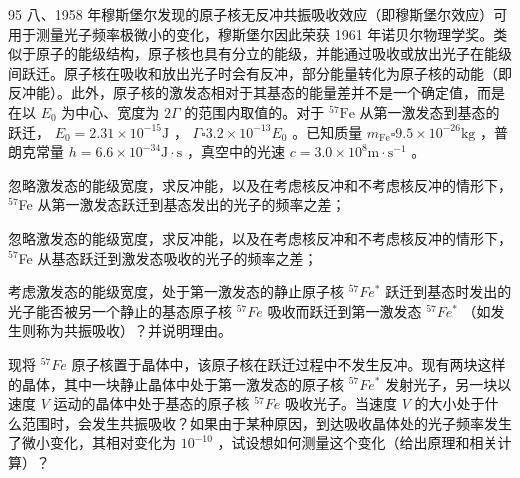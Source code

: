 \begin{problem}[第35届全国中学生物理竞赛复赛][穆斯堡尔效应]{95}
八、1958 年穆斯堡尔发现的原子核无反冲共振吸收效应（即穆斯堡尔效应）可用于测量光子频率极微小的变化，穆斯堡尔因此荣获 1961 年诺贝尔物理学奖。类似于原子的能级结构，原子核也具有分立的能级，并能通过吸收或放出光子在能级间跃迁。原子核在吸收和放出光子时会有反冲，部分能量转化为原子核的动能（即反冲能）。此外，原子核的激发态相对于其基态的能量差并不是一个确定值，而是在以 $E_0$ 为中心、宽度为 $2\Gamma$ 的范围内取值的。对于 $^{57}\text{Fe}$ 从第一激发态到基态的跃迁， $E_0 = 2.31 \times 10^{-15}\text{J}$ ， $\Gamma \square 3.2 \times 10^{-13}E_0$ 。已知质量 $m_{\text{Fe}} \square 9.5 \times 10^{-26}\text{kg}$ ，普朗克常量 $h = 6.6 \times 10^{-34}\text{J} \cdot \text{s}$ ，真空中的光速 $c = 3.0 \times 10^{8}\text{m} \cdot \text{s}^{-1}$ 。
\begin{subproblem}
忽略激发态的能级宽度，求反冲能，以及在考虑核反冲和不考虑核反冲的情形下， $^{57}$Fe 从第一激发态跃迁到基态发出的光子的频率之差；
\end{subproblem}
\begin{subproblem}
忽略激发态的能级宽度，求反冲能，以及在考虑核反冲和不考虑核反冲的情形下， $^{57}$Fe 从基态跃迁到激发态吸收的光子的频率之差；
\end{subproblem}
\begin{subproblem}
考虑激发态的能级宽度，处于第一激发态的静止原子核 $^{57}Fe^{*}$ 跃迁到基态时发出的光子能否被另一个静止的基态原子核 $^{57}Fe$ 吸收而跃迁到第一激发态 $^{57}Fe^{*}$ （如发生则称为共振吸收）？并说明理由。
\end{subproblem}
\begin{subproblem}
现将 ${}^{57}Fe$ 原子核置于晶体中，该原子核在跃迁过程中不发生反冲。现有两块这样的晶体，其中一块静止晶体中处于第一激发态的原子核 ${}^{57}Fe^{*}$ 发射光子，另一块以速度 $V$ 运动的晶体中处于基态的原子核 ${}^{57}Fe$ 吸收光子。当速度 $V$ 的大小处于什么范围时，会发生共振吸收？如果由于某种原因，到达吸收晶体处的光子频率发生了微小变化，其相对变化为 $10^{-10}$ ，试设想如何测量这个变化（给出原理和相关计算）？
\end{subproblem}
\end{problem}

